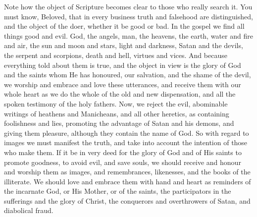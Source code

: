 \documentclass[10pt]{book}
\newcommand{\switchGreek}[1][]{\selectlanguage{polutonikogreek} \switchcolumn*[#1]}
\begin{document}
\begin{paracol}{2}
Note how the object of Scripture becomes 
clear to those who really search it. You must 
know, Beloved, that in every business truth and 
falsehood are distinguished, and the object of 
the doer, whether it be good or bad. In the 
gospel we find all things good and evil. God, 
the angels, man, the heavens, the earth, water 
and fire and air, the sun and moon and stars, 
light and darkness, Satan and the devils, the 
serpent and scorpions, death and hell, virtues 
and vices. And because everything told about 
them is true, and the object in view is the glory 
of God and the saints whom He has honoured, 
our salvation, and the shame of the devil, we 
worship and embrace and love these utterances, 
and receive them with our whole heart as we 
do the whole of the old and new dispensation, 
and all the spoken testimony of the holy 
fathers. Now, we reject the evil, abominable 
writings of heathens and Manicheans, and all 
other heretics, as containing foolishness and 
lies, promoting the advantage of Satan and his 
demons, and giving them pleasure, although 
they contain the name of God. So with regard 
to images we must manifest the truth, and take 
into account the intention of those who make 
them. If it be in very deed for the glory of 
God and of His saints to promote goodness, 
to avoid evil, and save souls, we should receive 
and honour and worship them as images, and 
remembrances, likenesses, and the books of the 
illiterate. We should love and embrace them 
with hand and heart as reminders of the 
incarnate God, or His Mother, or of the saints, 
the participators in the sufferings and the glory 
of Christ, the conquerors and overthrowers of 
Satan, and diabolical fraud.

\switchGreek


\end{paracol}
\end{document}
